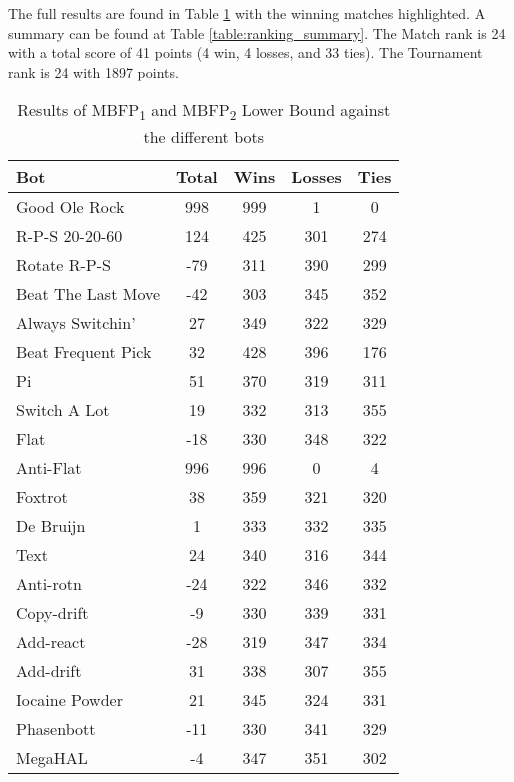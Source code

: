 The full results are found in Table \ref{table:JustMBFP2_LowerBound_results} with the winning matches highlighted. A summary can be found at Table \ref{table:ranking_summary}. The Match rank is 24 with a total score of 41 points (4 win, 4 losses, and 33 ties). The Tournament rank is 24 with 1897 points.

\begin{table}
    \caption{Results of MBFP\textsubscript{1} and MBFP\textsubscript{2} Lower Bound against the different bots}
    \label{table:JustMBFP2_LowerBound_results}
    \centering
    \begin{tabular}{|l|c|c|c|c|}
        \hline
        \textbf{Bot} & \textbf{Total} & \textbf{Wins} & \textbf{Losses} & \textbf{Ties} \\ \hline
\rowcolor{HighlightRowColor} Good Ole Rock & 998 & 999 & 1 & 0 \\ \hline 
\rowcolor{HighlightRowColor} R-P-S 20-20-60 & 124 & 425 & 301 & 274 \\ \hline 
Rotate R-P-S & -79 & 311 & 390 & 299 \\ \hline 
Beat The Last Move & -42 & 303 & 345 & 352 \\ \hline 
Always Switchin' & 27 & 349 & 322 & 329 \\ \hline 
Beat Frequent Pick & 32 & 428 & 396 & 176 \\ \hline 
\rowcolor{HighlightRowColor} Pi & 51 & 370 & 319 & 311 \\ \hline 
Switch A Lot & 19 & 332 & 313 & 355 \\ \hline 
Flat & -18 & 330 & 348 & 322 \\ \hline 
\rowcolor{HighlightRowColor} Anti-Flat & 996 & 996 & 0 & 4 \\ \hline 
Foxtrot & 38 & 359 & 321 & 320 \\ \hline 
De Bruijn & 1 & 333 & 332 & 335 \\ \hline 
Text & 24 & 340 & 316 & 344 \\ \hline 
Anti-rotn & -24 & 322 & 346 & 332 \\ \hline 
Copy-drift & -9 & 330 & 339 & 331 \\ \hline 
Add-react & -28 & 319 & 347 & 334 \\ \hline 
Add-drift & 31 & 338 & 307 & 355 \\ \hline 
Iocaine Powder & 21 & 345 & 324 & 331 \\ \hline 
Phasenbott & -11 & 330 & 341 & 329 \\ \hline 
MegaHAL & -4 & 347 & 351 & 302 \\ \hline 

\end{tabular}
\end{table}
